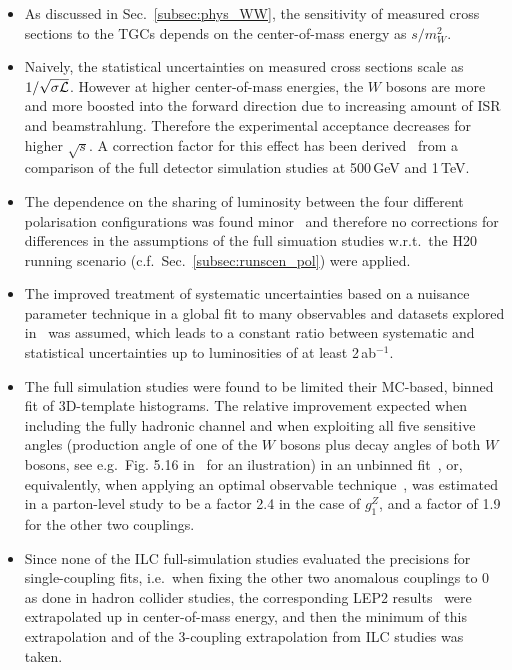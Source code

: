 \begin{itemize}
\item As discussed in Sec.~\ref{subsec:phys_WW}, the sensitivity of measured cross sections to the TGCs depends on the center-of-mass energy as $s/m_W^2$.
\item Naively, the statistical uncertainties on measured cross sections scale as $1/\sqrt{\sigma {\cal L}}$. However at higher center-of-mass energies, the $W$ bosons are more and more boosted into the forward direction due to increasing amount of ISR and beamstrahlung. Therefore the experimental acceptance decreases for higher $\sqrt{s}$. A correction factor for this effect has been derived~\cite{Karl:2017let} from a comparison of the full detector simulation studies at 500\,GeV and 1\,TeV.
\item The dependence on the sharing of luminosity between the four different polarisation configurations was found minor~\cite{Rosca:2016hcq} and therefore no corrections for differences in the assumptions of the full simuation studies w.r.t.\ the H20 running scenario (c.f.\ Sec.~\ref{subsec:runscen_pol}) were applied.
\item The improved treatment of systematic uncertainties based on a nuisance parameter technique in a global fit to many observables and datasets explored in~\cite{bib:PhDRobert} was assumed, which leads to a constant ratio between systematic and statistical uncertainties up to luminosities of at least 2\,ab$^{-1}$.
\item The full simulation studies were found to be limited their MC-based, binned fit of 3D-template histograms. The relative improvement expected when including the fully hadronic channel and when exploiting all five sensitive angles (production angle of one of the $W$ bosons plus decay angles of both $W$ bosons, see e.g.\ Fig. 5.16 in~\cite{Marchesini:94888} for an ilustration) in an unbinned fit~\cite{Barklow:1995sk}, or, equivalently, when applying an optimal observable technique~\cite{Diehl:1997ft, Diehl:2002nj}, was estimated in a parton-level study to be a factor 2.4 in the case of $ g^Z_1$, and a factor of 1.9 for the other two couplings.
\item Since none of the ILC full-simulation studies evaluated the precisions for single-coupling fits, i.e.\ when fixing the other two anomalous couplings to 0 as done in hadron collider studies,
the corresponding LEP2 results~\cite{Schael:2004tq} were extrapolated up in center-of-mass energy,
and then the minimum of this extrapolation and of the 3-coupling extrapolation from ILC studies was taken.
\end{itemize}

